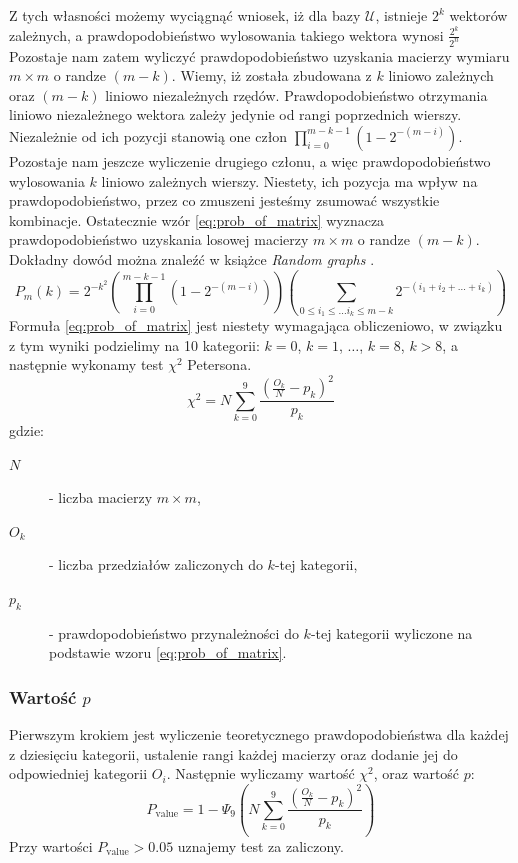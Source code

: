 Z tych własności możemy wyciągnąć wniosek, iż dla bazy $\mathcal{U}$, istnieje $2^k$ wektorów zależnych, a prawdopodobieństwo wylosowania takiego wektora wynosi $\frac{2^{k}}{2^{n}}$ 
Pozostaje nam zatem wyliczyć prawdopodobieństwo uzyskania macierzy wymiaru $m \times m$ o randze $(m - k)$. Wiemy, iż została zbudowana z $k$ liniowo zależnych oraz $(m-k)$ liniowo niezależnych rzędów. Prawdopodobieństwo otrzymania liniowo niezależnego wektora zależy jedynie od rangi poprzednich wierszy. Niezależnie od ich pozycji stanowią one człon $\prod_{i=0}^{m-k-1}(1-2^{-(m-i)})$. Pozostaje nam jeszcze wyliczenie drugiego członu, a więc prawdopodobieństwo wylosowania $k$ liniowo zależnych wierszy. Niestety, ich pozycja ma wpływ na prawdopodobieństwo, przez co zmuszeni jesteśmy zsumować wszystkie kombinacje. Ostatecznie wzór \ref{eq:prob_of_matrix} wyznacza prawdopodobieństwo uzyskania losowej macierzy $m\times m$ o randze $(m-k)$. Dokładny dowód można znaleźć w książce \emph{Random graphs} \cite{kolchin_1998}. 
\begin{equation}
    \label{eq:prob_of_matrix}
    P_m(k) = 2^{-k^2}\left(\prod_{i=0}^{m-k-1}(1-2^{-(m-i)})\right)\left(\sum_{0\leq i_1\leq\dots i_k\leq m-k}2^{-(i_1+i_2+\dots + i_k)}\right)
\end{equation}
Formuła \ref{eq:prob_of_matrix} jest niestety wymagająca obliczeniowo, w związku z tym wyniki podzielimy na 10 kategorii: $k=0$, $k=1$, $\dots$, $k=8$, $k > 8$, a następnie wykonamy test $\chi^2$ Petersona.
\begin{equation}
    \chi^2 = N\sum_{k=0}^{9}{\frac{(\frac{O_k}{N}-p_k)^2}{p_k}}
\end{equation}
gdzie:
\begin{description}
    \item[$N$] - liczba macierzy $m\times m$,
    \item[$O_k$] - liczba przedziałów zaliczonych do $k$-tej kategorii, 
    \item[$p_k$] - prawdopodobieństwo przynależności do $k$-tej kategorii wyliczone na podstawie wzoru \ref{eq:prob_of_matrix}.
\end{description}
\subsubsection{Wartość $p$}
Pierwszym krokiem jest wyliczenie teoretycznego prawdopodobieństwa dla każdej z dziesięciu kategorii, ustalenie rangi każdej macierzy oraz dodanie jej do odpowiedniej kategorii $O_i$. Następnie wyliczamy wartość $\chi^2$, oraz wartość $p$:
\begin{equation}
    P_{\textrm{value}} =  1 - \Psi_{9}\left(N\sum_{k=0}^{9}{\frac{(\frac{O_k}{N}-p_k)^2}{p_k}}\right)
\end{equation}
Przy wartości $P_{\textrm{value}} > 0.05$ uznajemy test za zaliczony.

